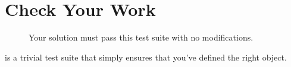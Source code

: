 \section{Check Your Work}

\begin{figure}
\caption{Your solution must pass this test suite with no modifications.}
\label{regex_trivial_tests}
\end{figure}

 is a trivial test suite that simply ensures that you've defined the right object.


